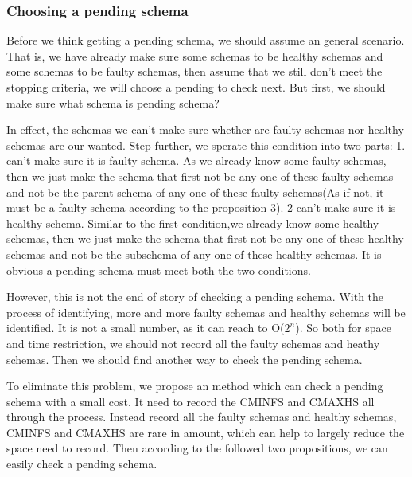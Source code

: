 \documentclass[10pt,journal,cspaper,compsoc]{IEEEtran}
\begin{document}
\subsubsection{Choosing a pending schema}
Before we think getting a pending schema, we should assume an general scenario. That is, we have already make sure some schemas to be healthy schemas and some schemas to be faulty schemas, then assume that we still don't meet the stopping criteria, we will choose a pending to check next. But first, we should make sure what schema is pending schema?

In effect, the schemas we can't make sure whether are faulty schemas nor healthy schemas are our wanted. Step further, we sperate this condition into two parts: 1. can't make sure it is faulty schema. As we already know some faulty schemas, then we just make the schema that first not be any one of these faulty schemas and not be the parent-schema of any one of these faulty schemas(As if not, it must be a faulty schema according to the proposition 3). 2 can't make sure it is healthy schema. Similar to the first condition,we already know some healthy schemas, then we just make the schema that first not be any one of these healthy schemas and not be the subschema of any one of these healthy schemas. It is obvious a pending schema must meet both the two conditions.

However, this is not the end of story of checking a pending schema. With the process of identifying, more and more faulty schemas and healthy schemas will be identified. It is not a small number, as it can reach to O($2^n$). So both for space and time restriction, we should not record all the faulty schemas and heathy schemas. Then we should find another way to check the pending schema.

To eliminate this problem, we propose an method which can check a pending schema with a small cost. It need to record the CMINFS and CMAXHS all through the process. Instead record all the faulty schemas and healthy schemas, CMINFS and CMAXHS are rare in amount, which can help to largely reduce the space need to record. Then according to the followed two propositions, we can easily check a pending schema.
\end{document}
